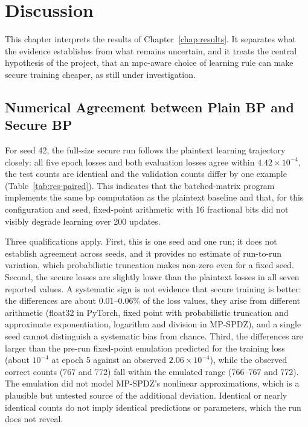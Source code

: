 \chapter{Discussion}\label{chap:discussion}

This chapter interprets the results of Chapter~\ref{chap:results}. It separates what the evidence establishes from what remains uncertain, and it treats the central hypothesis of the project, that an \ac{mpc}-aware choice of learning rule can make secure training cheaper, as still under investigation.

\section{Numerical Agreement between Plain BP and Secure BP}\label{sec:disc-agreement}
For seed 42, the full-size secure run follows the plaintext learning trajectory closely: all five epoch losses and both evaluation losses agree within $4.42\times10^{-4}$, the test counts are identical and the validation counts differ by one example (Table~\ref{tab:res-paired}). This indicates that the batched-matrix program implements the same \ac{bp} computation as the plaintext baseline and that, for this configuration and seed, fixed-point arithmetic with 16 fractional bits did not visibly degrade learning over 200 updates.

Three qualifications apply. First, this is one seed and one run; it does not establish agreement across seeds, and it provides no estimate of run-to-run variation, which probabilistic truncation makes non-zero even for a fixed seed. Second, the secure losses are slightly lower than the plaintext losses in all seven reported values. A systematic sign is not evidence that secure training is better: the differences are about 0.01--0.06\% of the loss values, they arise from different arithmetic (float32 in PyTorch, fixed point with probabilistic truncation and approximate exponentiation, logarithm and division in MP-SPDZ), and a single seed cannot distinguish a systematic bias from chance. Third, the differences are larger than the pre-run fixed-point emulation predicted for the training loss (about $10^{-4}$ at epoch 5 against an observed $2.06\times10^{-4}$), while the observed correct counts (767 and 772) fall within the emulated range (766--767 and 772). The emulation did not model MP-SPDZ's nonlinear approximations, which is a plausible but untested source of the additional deviation. Identical or nearly identical counts do not imply identical predictions or parameters, which the run does not reveal.


